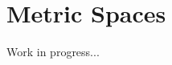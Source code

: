 \documentclass[a4paper,11pt]{book}
\theoremstyle{plain}
\theoremstyle{definition}
\begin{document}
\chapter{Metric Spaces}

Work in progress...
\end{document}
